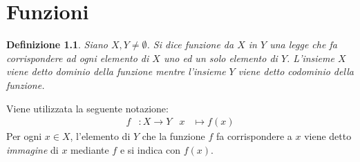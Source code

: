 \documentclass[11pt]{book}
\newtheorem*{definition}{Definizione}
\begin{document}
\chapter{Funzioni}
\begin{definition}
    Siano $X,Y\neq\emptyset$. Si dice funzione da $X$ in $Y$ una legge che fa corrispondere ad ogni elemento di $X$ uno 
    ed un solo elemento di $Y$. L'insieme $X$ viene detto dominio della funzione mentre l'insieme $Y$ viene detto codominio 
    della funzione.
\end{definition}
Viene utilizzata la seguente notazione:
\begin{align*}
    f&:X\rightarrow Y & x&\mapsto f(x)
\end{align*}
Per ogni $x\in X$, l'elemento di $Y$ che la funzione $f$ fa corrispondere a $x$ viene detto \textit{immagine} di $x$ 
mediante $f$ e si indica con $f(x)$.
\end{document}
